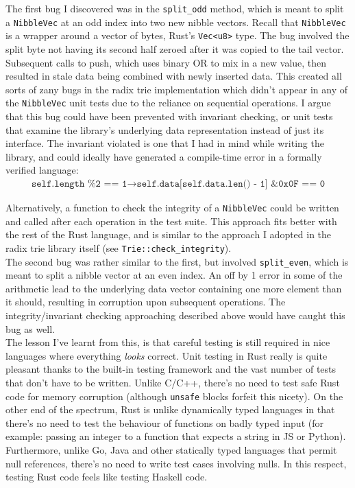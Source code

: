 \documentclass[a4paper,12pt]{article}
\newcommand{\code}{\texttt}
\begin{document}
The first bug I discovered was in the \code{split\_odd} method, which is meant to split a \code{NibbleVec} at an odd index into two new nibble vectors. Recall that \code{NibbleVec} is a wrapper around a vector of bytes, Rust's \code{Vec<u8>} type. The bug involved the split byte not having its second half zeroed after it was copied to the tail vector. Subsequent calls to push, which uses binary OR to mix in a new value, then resulted in stale data being combined with newly inserted data. This created all sorts of zany bugs in the radix trie implementation which didn't appear in any of the \code{NibbleVec} unit tests due to the reliance on sequential operations. I argue that this bug could have been prevented with invariant checking, or unit tests that examine the library's underlying data representation instead of just its interface. The invariant violated is one that I had in mind while writing the library, and could ideally have generated a compile-time error in a formally verified language:
\begin{eqnarray*}
\code{self.length \% 2 == 1} \rightarrow \code{self.data[self.data.len() - 1] \& 0x0F == 0}
\end{eqnarray*}

Alternatively, a function to check the integrity of a \code{NibbleVec} could be written and called after each operation in the test suite. This approach fits better with the rest of the Rust language, and is similar to the approach I adopted in the radix trie library itself (see \code{Trie::check\_integrity}).\\

The second bug was rather similar to the first, but involved \code{split\_even}, which is meant to split a nibble vector at an even index. An off by 1 error in some of the arithmetic lead to the underlying data vector containing one more element than it should, resulting in corruption upon subsequent operations. The integrity/invariant checking approaching described above would have caught this bug as well.\\

The lesson I've learnt from this, is that careful testing is still required in nice languages where everything \textit{looks} correct. Unit testing in Rust really is quite pleasant thanks to the built-in testing framework and the vast number of tests that don't have to be written. Unlike C/C++, there's no need to test safe Rust code for memory corruption (although \code{unsafe} blocks forfeit this nicety). On the other end of the spectrum, Rust is unlike dynamically typed languages in that there's no need to test the behaviour of functions on badly typed input (for example: passing an integer to a function that expects a string in JS or Python). Furthermore, unlike Go, Java and other statically typed languages that permit null references, there's no need to write test cases involving nulls. In this respect, testing Rust code feels like testing Haskell code.
\end{document}
